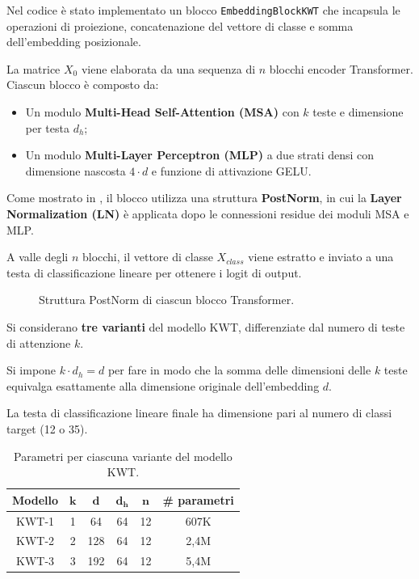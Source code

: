 \documentclass[11pt, a4paper]{article}
\begin{document}
Nel codice è stato implementato un blocco \texttt{EmbeddingBlockKWT} che incapsula le operazioni di proiezione, concatenazione del vettore di classe e somma dell'embedding posizionale.

La matrice $X_0$ viene elaborata da una sequenza di $n$ blocchi encoder Transformer. Ciascun blocco è composto da:
\begin{itemize}
  \item Un modulo \textbf{Multi-Head Self-Attention (MSA)} con $k$ teste e dimensione per testa $d_h$;
  \item Un modulo \textbf{Multi-Layer Perceptron (MLP)} a due strati densi con dimensione nascosta $4 \cdot d$ e funzione di attivazione GELU.
\end{itemize}

Come mostrato in , il blocco utilizza una struttura \textbf{PostNorm}, in cui la \textbf{Layer Normalization (LN)} è applicata dopo le connessioni residue dei moduli MSA e MLP.

A valle degli $n$ blocchi, il vettore di classe $X_{class}$ viene estratto e inviato a una testa di classificazione lineare per ottenere i logit di output.

\begin{figure}
  \center
  
  \caption{Struttura PostNorm di ciascun blocco Transformer.}
  \label{fig:kwt_postnorm}
\end{figure}

Si considerano \textbf{tre varianti} del modello KWT, differenziate dal numero di teste di attenzione $k$.

Si impone $k \cdot d_h = d$ per fare in modo che la somma delle dimensioni delle $k$ teste equivalga esattamente alla dimensione originale dell'embedding $d$.

La testa di classificazione lineare finale ha dimensione pari al numero di classi target (12 o 35).

\begin{table}
  \center
  \begin{tabular}{cccccc}
    \toprule
    \textbf{Modello} & $\mathbf{k}$ & $\mathbf{d}$ & $\mathbf{d_h}$ & $\mathbf{n}$ & \textbf{\# parametri} \\
    \midrule
    KWT-1 & 1 & 64 & 64 & 12 & 607K \\
    KWT-2 & 2 & 128 & 64 & 12 & 2,4M \\
    KWT-3 & 3 & 192 & 64 & 12 & 5,4M \\
    \bottomrule
  \end{tabular}
  \caption{Parametri per ciascuna variante del modello KWT.}
  \label{tab:kwt_varianti}
\end{table}
\end{document}
